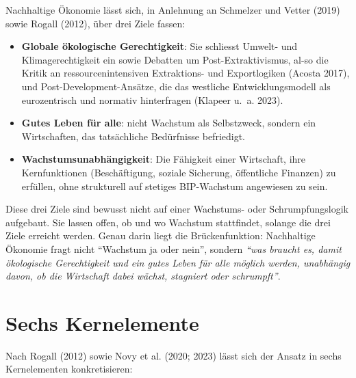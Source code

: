 \documentclass[
  nswissgerman,
  a4paper,
  DIV=11,
  numbers=noendperiod,
  oneside,
  openany]{scrreprt}
\begin{document}
Nachhaltige Ökonomie lässt sich, in Anlehnung an Schmelzer und Vetter
(2019) sowie Rogall (2012), über drei Ziele fassen:

\begin{itemize}
\item
  \textbf{Globale ökologische Gerechtigkeit}: Sie schliesst Umwelt- und
  Klimagerechtigkeit ein sowie Debatten um Post-Extraktivismus, al-so
  die Kritik an ressourcenintensiven Extraktions- und Exportlogiken
  (Acosta 2017), und Post-Development-Ansätze, die das westliche
  Entwicklungsmodell als eurozentrisch und normativ hinterfragen
  (Klapeer u.~a. 2023).
\item
  \textbf{Gutes Leben für alle}: nicht Wachstum als Selbstzweck, sondern
  ein Wirtschaften, das tatsächliche Bedürfnisse befriedigt.
\item
  \textbf{Wachstumsunabhängigkeit}: Die Fähigkeit einer Wirtschaft, ihre
  Kernfunktionen (Beschäftigung, soziale Sicherung, öffentliche
  Finanzen) zu erfüllen, ohne strukturell auf stetiges BIP-Wachstum
  angewiesen zu sein.
\end{itemize}

Diese drei Ziele sind bewusst nicht auf einer Wachstums- oder
Schrumpfungslogik aufgebaut. Sie lassen offen, ob und wo Wachstum
stattfindet, solange die drei Ziele erreicht werden. Genau darin liegt
die Brückenfunktion: Nachhaltige Ökonomie fragt nicht ``Wachstum ja oder
nein'', sondern \emph{``was braucht es, damit ökologische Gerechtigkeit
und ein gutes Leben für alle möglich werden, unabhängig davon, ob die
Wirtschaft dabei wächst, stagniert oder schrumpft''}.

\section{Sechs Kernelemente}\label{sechs-kernelemente}

Nach Rogall (2012) sowie Novy et al. (2020; 2023) lässt sich der Ansatz
in sechs Kernelementen konkretisieren:
\end{document}
